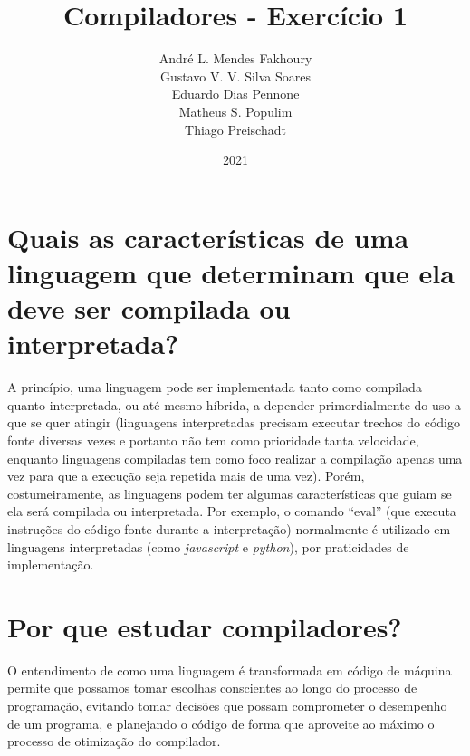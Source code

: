 \documentclass{article}
\title{Compiladores - Exercício 1}
\author{André L. Mendes Fakhoury\\
Gustavo V. V. Silva Soares\\
Eduardo Dias Pennone\\
Matheus S. Populim\\
Thiago Preischadt\\
}
\date{2021}
\begin{document}
\maketitle

\section{Quais as características de uma linguagem que determinam que ela deve ser compilada ou interpretada? %
}

A princípio, uma linguagem pode ser implementada tanto como compilada quanto interpretada, ou até mesmo híbrida, a depender primordialmente do uso a que se quer atingir (linguagens interpretadas precisam executar trechos do código fonte diversas vezes e portanto não tem como prioridade tanta velocidade, enquanto linguagens compiladas tem como foco realizar a compilação apenas uma vez para que a execução seja repetida mais de uma vez). Porém, costumeiramente, as linguagens podem ter algumas características que guiam se ela será compilada ou interpretada. Por exemplo, o comando ``eval'' (que executa instruções do código fonte durante a interpretação) normalmente é utilizado em linguagens interpretadas (como \textit{javascript} e \textit{python}), por praticidades de implementação.

\section{Por que estudar compiladores? %
}

O entendimento de como uma linguagem é transformada em código de máquina permite que possamos tomar escolhas conscientes ao longo do processo de programação, evitando tomar decisões que possam comprometer o desempenho de um programa, e planejando o código de forma que aproveite ao máximo o processo de otimização do compilador.
\end{document}
